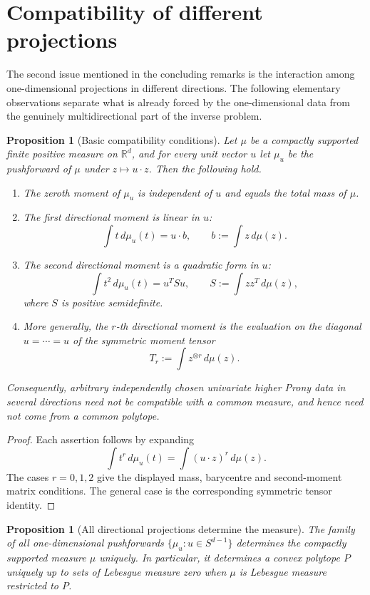 \documentclass[reqno]{amsart}
\numberwithin{theorem}{section}
\newtheorem{proposition}[theorem]{Proposition}
\newcommand{\RR}{\mathbb{R}}
\begin{document}
\section{Compatibility of different projections}\label{sec:projection-compatibility}

The second issue mentioned in the concluding remarks is the interaction among one-dimensional projections in different directions.  The following elementary observations separate what is already forced by the one-dimensional data from the genuinely multidirectional part of the inverse problem.

\begin{proposition}[Basic compatibility conditions]\label{prop:projection-compatibility}
Let $\mu$ be a compactly supported finite positive measure on $\RR^d$, and for every unit vector $u$ let $\mu_u$ be the pushforward of $\mu$ under $z\mapsto u\cdot z$.  Then the following hold.
\begin{enumerate}
\item The zeroth moment of $\mu_u$ is independent of $u$ and equals the total mass of $\mu$.
\item The first directional moment is linear in $u$:
\[
\int t\,d\mu_u(t)=u\cdot b,
\qquad b:=\int z\,d\mu(z).
\]
\item The second directional moment is a quadratic form in $u$:
\[
\int t^2\,d\mu_u(t)=u^T S u,
\qquad S:=\int zz^T\,d\mu(z),
\]
where $S$ is positive semidefinite.
\item More generally, the $r$-th directional moment is the evaluation on the diagonal $u=\cdots=u$ of the symmetric moment tensor
\[
T_r:=\int z^{\otimes r}\,d\mu(z).
\]
\end{enumerate}
Consequently, arbitrary independently chosen univariate higher Prony data in several directions need not be compatible with a common measure, and hence need not come from a common polytope.
\end{proposition}

\begin{proof}
Each assertion follows by expanding
\[
\int t^r\,d\mu_u(t)=\int (u\cdot z)^r\,d\mu(z).
\]
The cases $r=0,1,2$ give the displayed mass, barycentre and second-moment matrix conditions.  The general case is the corresponding symmetric tensor identity.
\end{proof}

\begin{proposition}[All directional projections determine the measure]\label{prop:cw}
The family of all one-dimensional pushforwards $\{\mu_u:u\in S^{d-1}\}$ determines the compactly supported measure $\mu$ uniquely.  In particular, it determines a convex polytope $P$ uniquely up to sets of Lebesgue measure zero when $\mu$ is Lebesgue measure restricted to $P$.
\end{proposition}
\end{document}
